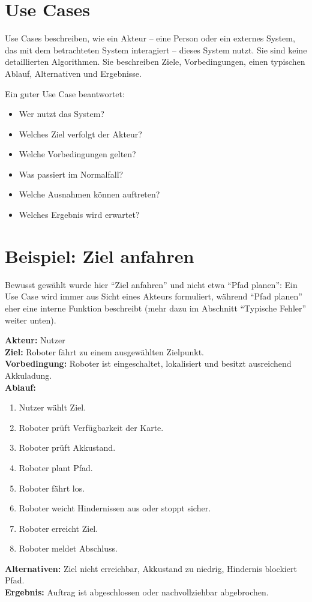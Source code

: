 \section{Use Cases}
Use Cases beschreiben, wie ein Akteur – eine Person oder ein externes System, das mit dem betrachteten System interagiert – dieses System nutzt. Sie sind keine detaillierten Algorithmen. Sie beschreiben Ziele, Vorbedingungen, einen typischen Ablauf, Alternativen und Ergebnisse.

Ein guter Use Case beantwortet:

\begin{itemize}
    \item Wer nutzt das System?
    \item Welches Ziel verfolgt der Akteur?
    \item Welche Vorbedingungen gelten?
    \item Was passiert im Normalfall?
    \item Welche Ausnahmen können auftreten?
    \item Welches Ergebnis wird erwartet?
\end{itemize}

\section{Beispiel: Ziel anfahren}
Bewusst gewählt wurde hier \enquote{Ziel anfahren} und nicht etwa \enquote{Pfad planen}: Ein Use Case wird immer aus Sicht eines Akteurs formuliert, während \enquote{Pfad planen} eher eine interne Funktion beschreibt (mehr dazu im Abschnitt \enquote{Typische Fehler} weiter unten).

\textbf{Akteur:} Nutzer\\
\textbf{Ziel:} Roboter fährt zu einem ausgewählten Zielpunkt.\\
\textbf{Vorbedingung:} Roboter ist eingeschaltet, lokalisiert und besitzt ausreichend Akkuladung.\\
\textbf{Ablauf:}
\begin{enumerate}
    \item Nutzer wählt Ziel.
    \item Roboter prüft Verfügbarkeit der Karte.
    \item Roboter prüft Akkustand.
    \item Roboter plant Pfad.
    \item Roboter fährt los.
    \item Roboter weicht Hindernissen aus oder stoppt sicher.
    \item Roboter erreicht Ziel.
    \item Roboter meldet Abschluss.
\end{enumerate}
\textbf{Alternativen:} Ziel nicht erreichbar, Akkustand zu niedrig, Hindernis blockiert Pfad.\\
\textbf{Ergebnis:} Auftrag ist abgeschlossen oder nachvollziehbar abgebrochen.

